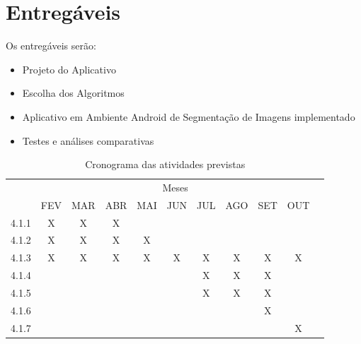\section{Entregáveis}
Os entregáveis serão:

\begin{itemize}
\item Projeto do  Aplicativo
\item Escolha dos Algoritmos 
\item Aplicativo em Ambiente Android de Segmentação de Imagens implementado
\item Testes e análises comparativas
\end{itemize}


\begin{table}[!htpb]
\centering

\begin{small} 
  
\setlength{\tabcolsep}{3pt} 


\begin{tabular}{|c|c|c|c|c|c|c|c|c|c|c|}\hline
 & \multicolumn{9}{c|}{Meses}\\ \cline{2-10}
\raisebox{1.5ex}{Etapa} & FEV & MAR & ABR & MAI & JUN & JUL & AGO & SET & OUT \\ \hline

4.1.1 & X & X & X & & & & & &   \\ \hline
4.1.2 & X & X & X & X & & & & &   \\ \hline
4.1.3 & X & X & X & X & X & X & X & X & X    \\ \hline
4.1.4 & &  &  & &  & X & X & X &  \\ \hline
4.1.5 & &  &  & &  & X & X & X &    \\ \hline
4.1.6 & & & & & & & & X &   \\ \hline
4.1.7 & & & & & & & & & X  \\ \hline

\end{tabular} 
\end{small}
\caption{Cronograma das atividades previstas}
\label{t_cronograma}
\end{table} 

